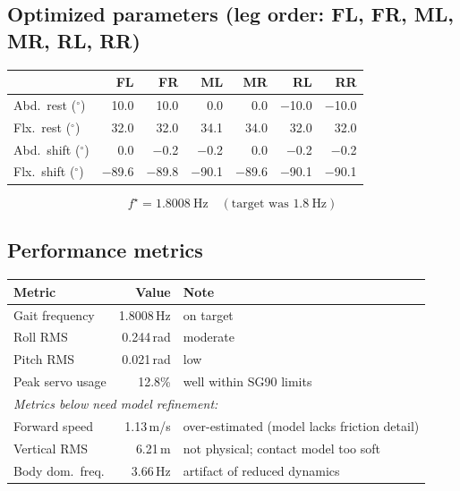 \documentclass[11pt]{article}
\begin{document}
\subsection*{Optimized parameters \normalfont(leg order: FL, FR, ML, MR, RL, RR)}

\begin{center}
\begin{tabular}{l rrrrrr}
\toprule
 & FL & FR & ML & MR & RL & RR \\
\midrule
Abd.\ rest ($^\circ$) & 10.0 & 10.0 & 0.0 & 0.0 & $-$10.0 & $-$10.0 \\
Flx.\ rest ($^\circ$) & 32.0 & 32.0 & 34.1 & 34.0 & 32.0 & 32.0 \\
Abd.\ shift ($^\circ$) & 0.0 & $-$0.2 & $-$0.2 & 0.0 & $-$0.2 & $-$0.2 \\
Flx.\ shift ($^\circ$) & $-$89.6 & $-$89.8 & $-$90.1 & $-$89.6 & $-$90.1 & $-$90.1 \\
\bottomrule
\end{tabular}
\end{center}

\[
f^\star = 1.8008~\text{Hz}\quad(\text{target was }1.8~\text{Hz})
\]

\subsection*{Performance metrics}

\begin{center}
\begin{tabular}{l r l}
\toprule
\textbf{Metric} & \textbf{Value} & \textbf{Note} \\
\midrule
Gait frequency       & 1.8008\,Hz  & on target \\
Roll RMS             & 0.244\,rad  & moderate \\
Pitch RMS            & 0.021\,rad  & low \\
Peak servo usage     & 12.8\%      & well within SG90 limits \\
\midrule
\multicolumn{3}{l}{\textit{Metrics below need model refinement:}} \\
Forward speed        & 1.13\,m/s   & over-estimated (model lacks friction detail) \\
Vertical RMS         & 6.21\,m     & not physical; contact model too soft \\
Body dom.\ freq.     & 3.66\,Hz    & artifact of reduced dynamics \\
\bottomrule
\end{tabular}
\end{center}
\end{document}
